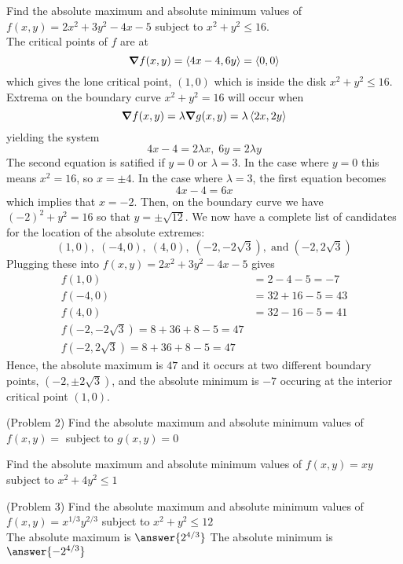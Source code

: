 \documentclass[handout]{ximera}
\begin{document}
\begin{example}[Example 2]
Find the absolute maximum and absolute minimum values of $f(x,y) = 2x^2 + 3y^2 - 4x - 5$ subject to $x^2 + y^2 \leq 16$.\\
The critical points of $f$ are at
\[
\boldsymbol\nabla f(x,y) = \left\langle 4x -4, 6y\right\rangle = \left\langle 0,0\right\rangle
\]
 which gives the lone critical point, $(1,0)$ which is inside the disk $x^2 + y^2 \leq 16$.\\
 Extrema on the boundary curve $x^2 + y^2 = 16$ will occur when
 \[
 \boldsymbol\nabla f(x,y) = \lambda \boldsymbol\nabla g(x,y) = \lambda \left\langle 2x, 2y\right\rangle
 \]
 yielding the system
 \[
 4x - 4 = 2\lambda x, \; 6y = 2\lambda y
 \]
 The second equation is satified if $y = 0$ or $\lambda = 3$.  In the case where $y = 0$ this means $x^2 = 16$, so $x = \pm 4$.
 In the case where $\lambda = 3$, the first equation becomes
 \[
 4x - 4 = 6x 
 \]
 which implies that $x = -2$.  Then, on the boundary curve we have $(-2)^2 + y^2 = 16$ so that $y = \pm \sqrt{12}$.
 We now have a complete list of candidates for the location of the absolute extremes:
 \[
 (1,0), \; (-4, 0), \; (4,0), \; (-2, -2\sqrt3), \;\text{and} \; (-2, 2\sqrt 3)
 \]
 Plugging these into $f(x,y) = 2x^2 + 3y^2 - 4x - 5$ gives
 \begin{align*}
 f(1,0) &= 2-4-5=-7\\
 f(-4, 0) &= 32 +16 -5 = 43\\
 f(4, 0) &= 32 -16 -5 = 41\\
 f(-2, -2\sqrt3) = 8 + 36 +8-5 = 47\\
 f(-2, 2\sqrt3) = 8 + 36 +8-5 = 47
 \end{align*}
 Hence, the absolute maximum is $47$ and it occurs at two different boundary points, $(-2, \pm 2\sqrt 3)$,
 and the absolute minimum is $-7$ occuring at the interior critical point $(1,0)$.
 
 
\end{example}

\begin{problem}(Problem 2)
Find the absolute maximum and absolute minimum values of $f(x,y) = $ subject to $g(x,y) = 0$\\
\end{problem}

\begin{example}[Example 3]
Find the absolute maximum and absolute minimum values of $f(x,y) = xy$ subject to $x^2 + 4y^2 \leq 1$\\
\end{example}

\begin{problem}(Problem 3)
Find the absolute maximum and absolute minimum values of $f(x,y) = x^{1/3}y^{2/3}$ subject to $x^2 + y^2 \leq 12$\\
The absolute maximum is $\answer{2^{4/3}}$
The absolute minimum is $\answer{-2^{4/3}}$
\end{problem}
\end{document}
